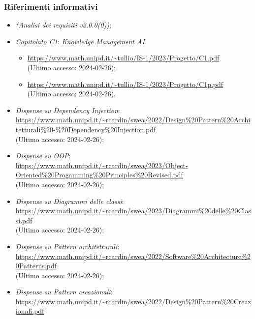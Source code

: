 \documentclass[10pt, a4paper]{article}
\begin{document}
    \subsubsection{Riferimenti informativi}
    \begin{itemize}
        \item \textit{(Analisi dei requisiti v2.0.0(0))};
        \item \textit{Capitolato C1}: \textit{Knowledge Management AI}
        \begin{itemize}
            \item \url{https://www.math.unipd.it/~tullio/IS-1/2023/Progetto/C1.pdf}\\
            (Ultimo accesso: 2024-02-26);
            \item \url{https://www.math.unipd.it/~tullio/IS-1/2023/Progetto/C1p.pdf}\\
            (Ultimo accesso: 2024-02-26).
        \end{itemize}
        \item \textit{Dispense su Dependency Injection}: \\
            \url{https://www.math.unipd.it/~rcardin/swea/2022/Design%20Pattern%20Architetturali%20-%20Dependency%20Injection.pdf}\\
            (Ultimo accesso: 2024-02-26);
        \item \textit{Dispense su OOP}: \\
            \url{https://www.math.unipd.it/~rcardin/swea/2023/Object-Oriented%20Progamming%20Principles%20Revised.pdf}\\
            (Ultimo accesso: 2024-02-26);
        \item \textit{Dispense su Diagrammi delle classi}: \\
            \url{https://www.math.unipd.it/~rcardin/swea/2023/Diagrammi%20delle%20Classi.pdf}\\
            (Ultimo accesso: 2024-02-26);
        \item \textit{Dispense su Pattern architetturali}: \\
            \url{https://www.math.unipd.it/~rcardin/swea/2022/Software%20Architecture%20Patterns.pdf}\\
            (Ultimo accesso: 2024-02-26);
        \item \textit{Dispense su Pattern creazionali}: \\
            \url{https://www.math.unipd.it/~rcardin/swea/2022/Design%20Pattern%20Creazionali.pdf}\\

\end{itemize}
\end{document}
